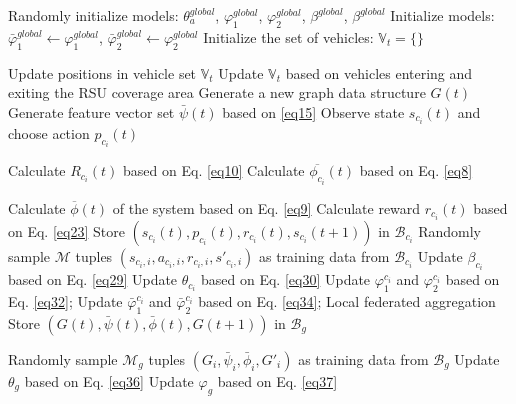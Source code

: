 \documentclass[lettersize,journal,onecolumn]{IEEEtran}
\begin{document}
\begin{algorithm}[b!]
 	\caption{GNN Combined SAC Training Stage Algorithm}
 	\label{algorithm2}
	Randomly initialize models: $\theta _{a}^{global}$, $\varphi _{1}^{global}$, $\varphi _{2}^{global}$, ${{\beta }^{{global}}}$, ${{\beta }^{{global}}}$\;
	Initialize models: $\bar{\varphi }_{1}^{global}\leftarrow \varphi _{1}^{global}$, $\bar{\varphi }_{2}^{global}\leftarrow \varphi _{2}^{global}$\;
	Initialize the set of vehicles: \({{\mathbb{V}}_{t}}=\{\}\)\;
	{
		Update positions in vehicle set \({{\mathbb{V}}_{t}}\)\;
		Update \({{\mathbb{V}}_{t}}\) based on vehicles entering and exiting the RSU coverage area\;
		Generate a new graph data structure $G(t)$\;
		Generate feature vector set $\bar{\psi }\left( t \right)$ based on \eqref{eq15}\;
 		{
 			Observe state ${{s}_{{{c}_{i}}}}(t)$ and choose action ${{p}_{{{c}_{i}}}}(t)$\;
 		}
 		{
 			Calculate ${{R}_{{{{c}}_{i}}}}(t)$ based on Eq. \eqref{eq10}\;
 			Calculate $\overline{{{\phi }_{{{{c}}_{i}}}}}(t)$ based on Eq. \eqref{eq8}\;
 			
 		}
 		Calculate $\overline{\phi }(t)$ of the system based on Eq. \eqref{eq9}\;		
 		{
 			Calculate reward ${{r}_{{{c}_{i}}}}(t)$ based on Eq. \eqref{eq23}\;
 			Store $\left( {{s}_{{{c}_{i}}}}(t),{{p}_{{{c}_{i}}}}(t),{{r}_{{{c}_{i}}}}(t),{{s}_{{{c}_{i}}}}(t+1) \right)$ in  ${{\mathcal{B}}_{{{c}_{i}}}}$\;
 			{
 				{
 					Randomly sample $\mathcal{M}$ tuples $\left( {{s}_{{{c}_{i}},i}},{{a}_{{{c}_{i}},i}},{{r}_{{{c}_{i}},i}},{{{{s}'}}_{{{c}_{i}},i}} \right)$ as training data from ${{\mathcal{B}}_{{{c}_{i}}}}$\;
 					 Update ${{\beta }_{{{c}_{i}}}}$ based on Eq. \eqref{eq29}\;
 					 Update ${{\theta }_{{{c}_{i}}}}$ based on Eq. \eqref{eq30}\;
 					 Update $\varphi _{1}^{{{c}_{i}}}$ and $\varphi _{2}^{{{c}_{i}}}$ based on Eq. \eqref{eq32};
 				}
 				{
 				Update $\bar{\varphi }_{1}^{{{c}_{i}}}$ and $\bar{\varphi }_{2}^{{{c}_{i}}}$  based on Eq. \eqref{eq34};
 				}
 				Local federated aggregation\;
 			}
 		}
 		Store  $\left( G(t),\bar{\psi }\left( t \right),\bar{\phi }(t),G(t+1) \right)$ in  ${{\mathcal{B}}_{g}}$\;
 		{
 			{
 			Randomly sample ${{\mathcal{M}}_{g}}$ tuples $\left( {{G}_{i}},{{{\bar{\psi }}}_{i}},{{{\bar{\phi }}}_{i}},{{{{G}'}}_{i}} \right)$ as training data from ${{\mathcal{B}}_{g}}$\;
 			Update ${{\theta }_{g}}$ based on Eq. \eqref{eq36}\;
 			Update ${{\varphi }_{g}}$ based on Eq. \eqref{eq37}\;

}}}
\end{algorithm}
\end{document}
